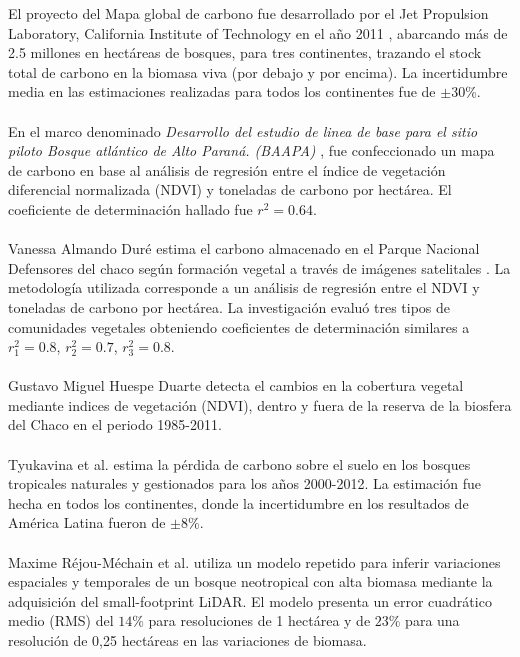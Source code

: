 El proyecto del Mapa global de carbono fue desarrollado por el Jet Propulsion Laboratory, California Institute of Technology en el a\~{n}o 2011 \cite{saatchi2011benchmark}, abarcando m\'as de 2.5 millones en hect\'areas de bosques, para tres continentes, trazando el stock total de carbono en la biomasa viva (por debajo y por encima). La incertidumbre media en las estimaciones realizadas para todos los continentes fue de $ \pm 30$\%.\\~\\
En el marco denominado \textit{Desarrollo del estudio de linea de base para el sitio piloto Bosque atl\'antico de Alto Paran\'a. (BAAPA)} \cite{BAAPA2013}, fue confeccionado un mapa de carbono en base al an\'alisis de regresi\'on entre el \'indice de vegetaci\'on diferencial normalizada (NDVI) y toneladas de carbono por hect\'area. El coeficiente de determinaci\'on hallado fue $ r^{2}=0.64 $.\\~\\
 Vanessa Almando Dur\'e \cite{kris2014estimacion} estima el carbono almacenado en el Parque Nacional Defensores del chaco seg\'un formaci\'on vegetal a trav\'es de im\'agenes satelitales . La metodolog\'ia utilizada corresponde a un an\'alisis de regresi\'on entre el NDVI y toneladas de carbono por hect\'area. La investigaci\'on evalu\'o tres tipos de comunidades vegetales obteniendo coeficientes de determinaci\'on similares a $ r_{1}^{2}=0.8$, $ r_{2}^{2}=0.7 $, $r_{3}^{2}=0.8 $.\\~\\
 Gustavo Miguel Huespe Duarte \cite{gustavo2012deteccion} detecta el cambios en la cobertura vegetal mediante indices de vegetaci\'on (NDVI), dentro y fuera de la reserva de la biosfera del Chaco en el periodo 1985-2011.\\~\\
Tyukavina et al. \cite{tyukavina2015aboveground} estima la p\'erdida de carbono sobre el suelo en los bosques tropicales naturales y gestionados para los a\~{n}os 2000-2012. La estimaci\'on fue hecha en todos los continentes, donde la incertidumbre en los resultados de Am\'erica Latina fueron de $ \pm 8 $\%.\\~\\
Maxime R\'ejou-M\'echain et al. \cite{rejou2015using} utiliza un modelo repetido para inferir variaciones espaciales y temporales de un bosque neotropical con alta biomasa mediante la adquisici\'on del small-footprint LiDAR. El modelo presenta un error cuadr\'atico medio (RMS) del $ 14\% $ para resoluciones de 1 hect\'area y de $ 23\% $ para una resoluci\'on de 0,25 hect\'areas en las variaciones de biomasa.\\~\\
